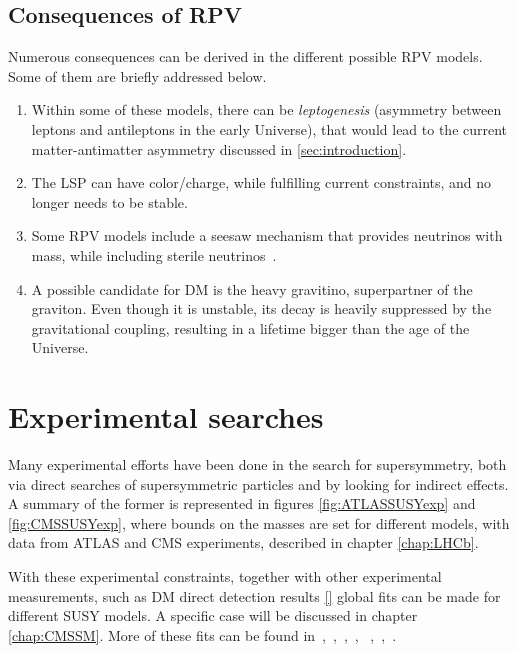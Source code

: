 \subsection{Consequences of RPV}
\label{sec:RPVcons}
Numerous consequences can be derived in the different possible RPV models. Some of them are briefly addressed below. 
\begin{enumerate}
\item Within some of these models, there can be \textit{leptogenesis} (asymmetry between leptons and antileptons in the early Universe), that would lead to the current matter-antimatter asymmetry discussed in \ref{sec:introduction}.
\item The LSP can have color/charge, while fulfilling current constraints, and no longer needs to be stable. 
\item Some RPV models include a seesaw mechanism that provides neutrinos with mass, while including sterile neutrinos~\cite{Ghosh:2010hy}.
\item A possible candidate for DM is the heavy gravitino, superpartner of the graviton. Even though it is unstable, its decay is heavily suppressed by the gravitational coupling, resulting in a lifetime bigger than the age of the Universe. 
\end{enumerate}


\section{Experimental searches}
\label{SUSY:exp}

Many experimental efforts have been done in the search for supersymmetry, both via direct searches of supersymmetric particles and by looking for indirect effects. A summary of the former is represented in figures \ref{fig:ATLASSUSYexp} and \ref{fig:CMSSUSYexp}, where bounds on the masses are set for different models, with data from ATLAS and CMS experiments, described in chapter \ref{chap:LHCb}.  

With these experimental constraints, together with other experimental measurements, such as DM direct detection results \ref{} global fits can be made for different SUSY models. A specific case will be discussed in chapter \ref{chap:CMSSM}. More of these fits can be found in~\cite{Athron:2018vxy},~\cite{Athron:2017yua},~\cite{Athron:2017qdc},~\cite{Bagnaschi:2016afc},  
~\cite{Bagnaschi:2016xfg},~\cite{Bagnaschi:2017tru},~\cite{Costa:2017gup}.

